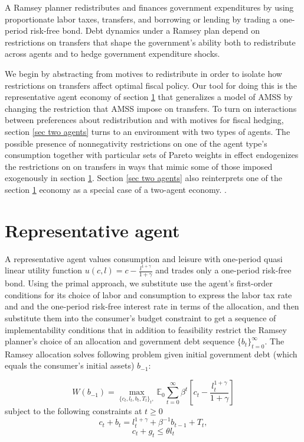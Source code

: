\documentclass[thmsb,11pt]{article}
\begin{document}
 A Ramsey planner redistributes and finances  government expenditures by  using proportionate labor taxes, transfers, and borrowing or lending by trading a one-period risk-free bond.  Debt dynamics  under a Ramsey plan depend on  restrictions  on transfers that shape the government's
  ability both to redistribute across agents and  to hedge
 government expenditure shocks.

 We begin by abstracting from motives to redistribute in order to isolate how restrictions on transfers affect optimal fiscal policy.  
 Our tool for doing this is the representative agent economy of section \ref{sec rep agent} that generalizes a model of  AMSS by changing
 the restriction that AMSS impose on transfers.  To turn  on interactions between  preferences about redistribution and with motives for fiscal hedging, section \ref{sec two agents} turns  to an environment with two types of agents.  The possible presence of nonnegativity
 restrictions on one of the agent type's consumption together with particular sets of Pareto weights in effect  endogenizes the  restrictions on
on transfers in ways that  mimic some of those imposed  exogenously in section \ref{sec rep agent}.  Section \ref{sec two agents}  also
reinterprets one of the section \ref{sec rep agent} economy as a special case of a two-agent economy.  
.  
\section{Representative agent}
\label{sec rep agent}
 A representative agent  values consumption and leisure with one-period quasi linear utility function  $u(c,l)=c-\frac{l^{1+\gamma}}{1+\gamma}$ and 
 trades only  a one-period risk-free bond. Using the primal approach, we substitute use the agent's first-order conditions for
 its choice of labor and consumption to express the labor  tax rate and and the one-period risk-free interest  rate in terms of the
  allocation, and then substitute them  into  the
 consumer's budget constraint to get a sequence of implementability conditions that in addition to feasibility restrict the
  Ramsey planner's choice of an allocation and government debt sequence $\{b_t\}_{t=0}^\infty$.  The Ramsey allocation 
  solves  following problem given  initial government debt (which equals the consumer's  initial assets) $b_{-1}$:

\begin{equation}
W(b_{-1})= \max_{\{c_t,l_t,b_{t},T_t\}_t,}\mathbb{E}_0\sum_{t=0}^\infty \beta^t \left[c_t-\frac{l_t^{1+\gamma}}{1+\gamma}\right]
\end{equation}
subject to the following constraints at  $t\geq 0$
\begin{equation}
\label{eq imp}
c_t+b_{t}=l_t^{1+\gamma}+\beta^{-1}b_{t-1}+T_t ,
\end{equation}
\begin{equation}
c_t+g_t \leq \theta l_t
\end{equation}
\end{document}
